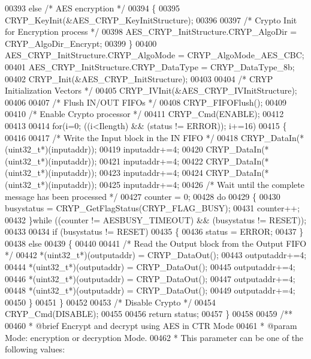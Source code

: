 \begin{DoxyCode}
00393   \textcolor{keywordflow}{else} \textcolor{comment}{/* AES encryption */}
00394   \{
00395     CRYP_KeyInit(&AES\_CRYP\_KeyInitStructure);
00396 
00397     \textcolor{comment}{/* Crypto Init for Encryption process */}
00398     AES\_CRYP\_InitStructure.CRYP_AlgoDir  = CRYP_AlgoDir_Encrypt;
00399   \}
00400   AES\_CRYP\_InitStructure.CRYP_AlgoMode = CRYP_AlgoMode_AES_CBC;
00401   AES\_CRYP\_InitStructure.CRYP_DataType = CRYP_DataType_8b;
00402   CRYP_Init(&AES\_CRYP\_InitStructure);
00403 
00404   \textcolor{comment}{/* CRYP Initialization Vectors */}
00405   CRYP_IVInit(&AES\_CRYP\_IVInitStructure);
00406 
00407   \textcolor{comment}{/* Flush IN/OUT FIFOs */}
00408   CRYP_FIFOFlush();
00409 
00410   \textcolor{comment}{/* Enable Crypto processor */}
00411   CRYP_Cmd(ENABLE);
00412 
00413 
00414   \textcolor{keywordflow}{for}(i=0; ((i<Ilength) && (status != ERROR)); i+=16)
00415   \{
00416 
00417     \textcolor{comment}{/* Write the Input block in the IN FIFO */}
00418     CRYP\_DataIn(*(uint32\_t*)(inputaddr));
00419     inputaddr+=4;
00420     CRYP\_DataIn(*(uint32\_t*)(inputaddr));
00421     inputaddr+=4;
00422     CRYP\_DataIn(*(uint32\_t*)(inputaddr));
00423     inputaddr+=4;
00424     CRYP\_DataIn(*(uint32\_t*)(inputaddr));
00425     inputaddr+=4;
00426     \textcolor{comment}{/* Wait until the complete message has been processed */}
00427     counter = 0;
00428     \textcolor{keywordflow}{do}
00429     \{
00430       busystatus = CRYP\_GetFlagStatus(CRYP_FLAG_BUSY);
00431       counter++;
00432     \}\textcolor{keywordflow}{while} ((counter != AESBUSY_TIMEOUT) && (busystatus != RESET));
00433 
00434     \textcolor{keywordflow}{if} (busystatus != RESET)
00435    \{
00436        status = ERROR;
00437     \}
00438     \textcolor{keywordflow}{else}
00439     \{
00440 
00441       \textcolor{comment}{/* Read the Output block from the Output FIFO */}
00442       *(uint32\_t*)(outputaddr) = CRYP\_DataOut();
00443       outputaddr+=4;
00444       *(uint32\_t*)(outputaddr) = CRYP\_DataOut();
00445       outputaddr+=4;
00446       *(uint32\_t*)(outputaddr) = CRYP\_DataOut();
00447       outputaddr+=4;
00448       *(uint32\_t*)(outputaddr) = CRYP\_DataOut();
00449       outputaddr+=4;
00450     \}
00451   \}
00452 
00453   \textcolor{comment}{/* Disable Crypto */}
00454   CRYP_Cmd(DISABLE);
00455 
00456   \textcolor{keywordflow}{return} status;
00457 \}
00458 
00459 \textcolor{comment}{/**}
00460 \textcolor{comment}{  * @brief  Encrypt and decrypt using AES in CTR Mode}
00461 \textcolor{comment}{  * @param  Mode: encryption or decryption Mode.}
00462 \textcolor{comment}{  *           This parameter can be one of the following values:}

\end{DoxyCode}
